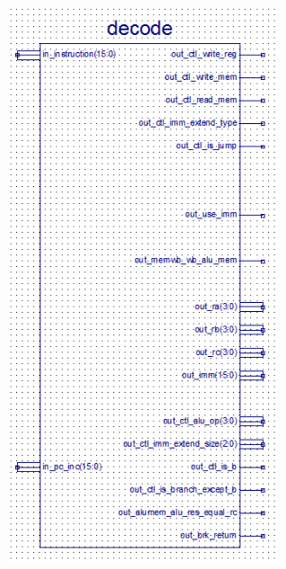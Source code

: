 \begin{center}
    \includegraphics[width=8cm]{image/detail/detail_decode.png}
    \label{fig:decode}
\end{center}
